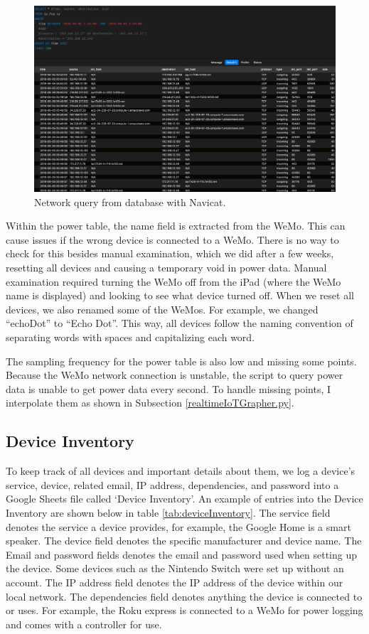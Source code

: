 \begin{figure}[H]
    \centering
    \includegraphics[width=1\textwidth]{figures/navicatNetworkQuery.png}
    \caption{Network query from database with Navicat.}
    \label{fig:navicatNetworkQuery}
\end{figure}

Within the power table, the name field is extracted from the WeMo. This can cause issues if the wrong device is connected to a WeMo. There is no way to check for this besides manual examination, which we did after a few weeks, resetting all devices and causing a temporary void in power data. Manual examination required turning the WeMo off from the iPad (where the WeMo name is displayed) and looking to see what device turned off. When we reset all devices, we also renamed some of the WeMos. For example, we changed ``echoDot'' to ``Echo Dot''. This way, all devices follow the naming convention of separating words with spaces and capitalizing each word.

The sampling frequency for the power table is also low and missing some points. Because the WeMo network connection is unstable, the script to query power data is unable to get power data every second. To handle missing points, I interpolate them as shown in Subsection \ref{realtimeIoTGrapher.py}.

\subsection{Device Inventory}
\label{Device Inventory}
To keep track of all devices and important details about them, we log a device's service, device, related email, IP address, dependencies, and password into a Google Sheets file called `Device Inventory'. An example of entries into the Device Inventory are shown below in table \ref{tab:deviceInventory}. The service field denotes the service a device provides, for example, the Google Home is a smart speaker. The device field denotes the specific manufacturer and device name. The Email and password fields denotes the email and password used when setting up the device. Some devices such as the Nintendo Switch were set up without an account. The IP address field denotes the IP address of the device within our local network. The dependencies field denotes anything the device is connected to or uses. For example, the Roku express is connected to a WeMo for power logging and comes with a controller for use.

